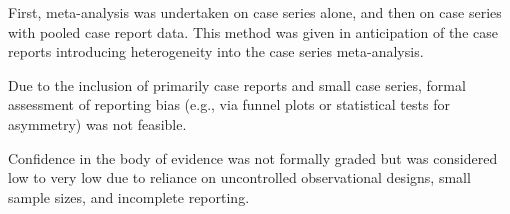 First, meta-analysis was undertaken on case series alone, and then on case series with pooled case report data. This method was given in anticipation of the case reports introducing heterogeneity into the case series meta-analysis.

Due to the inclusion of primarily case reports and small case series, formal assessment of reporting bias (e.g., via funnel plots or statistical tests for asymmetry) was not feasible. 

Confidence in the body of evidence was not formally graded but was considered low to very low due to reliance on uncontrolled observational designs, small sample sizes, and incomplete reporting.
